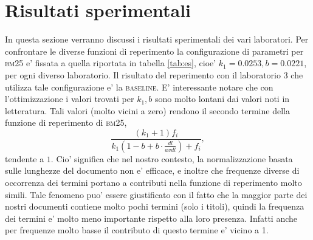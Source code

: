 \section{Risultati sperimentali}
\label{sec:risult-sper}

In questa sezione verranno discussi i risultati sperimentali dei vari laboratori. Per confrontare le diverse funzioni di reperimento la configurazione di parametri per \textsc{bm25} e' fissata a quella riportata in tabella \ref{tab:es}, cioe' $k_1 = 0.0253, b = 0.0221$, per ogni diverso laboratorio. Il risultato del reperimento con il laboratorio 3 che utilizza tale configurazione e' la \textsc{baseline}.
E' interessante notare che con l'ottimizzazione i valori trovati per $k_1, b$ sono molto lontani dai valori noti in letteratura. Tali valori (molto vicini a zero) rendono il secondo termine della funzione di reperimento di \textsc{bm25}, 
\[\frac{(k_1 + 1)f_i}{k_1(1-b+b \cdot \frac{dl}{avdl})+f_i},\] 
tendente a $1$. Cio' significa che nel nostro contesto, la normalizzazione basata sulle lunghezze del documento non e' efficace, e inoltre che frequenze diverse di occorrenza dei termini portano a contributi nella funzione di reperimento molto simili. Tale fenomeno puo' essere giustificato con il fatto che la maggior parte dei nostri documenti contiene molto pochi termini (solo i titoli), quindi la frequenza dei termini e' molto meno importante rispetto alla loro presenza. Infatti anche per frequenze molto basse il contributo di questo termine e' vicino a 1.

